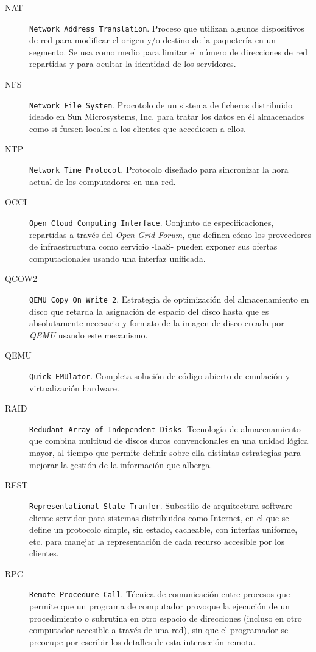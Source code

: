 \begin{description}
\item[NAT] \texttt{Network Address Translation}. Proceso que utilizan algunos dis\-po\-si\-ti\-vos de red para modificar el origen y/o destino de la paqueter\'ia en un segmento. Se usa como medio para limitar el n\'umero de direcciones de red repartidas y para ocultar la identidad de los servidores.
\item[NFS] \texttt{Network File System}. Procotolo de un sistema de ficheros distribuido ideado en Sun Microsystems, Inc. para tratar los datos en \'el almacenados como si fuesen locales a los clientes que accediesen a ellos.
\item[NTP] \texttt{Network Time Protocol}. Protocolo dise\~nado para sincronizar la hora actual de los computadores en una red.
\item[OCCI] \texttt{Open Cloud Computing Interface}. Conjunto de especificaciones, re\-par\-ti\-das a trav\'es del \emph{Open Grid Forum}, que definen c\'omo los proveedores de infraestructura como servicio -IaaS- pueden exponer sus ofertas computacionales usando una interfaz unificada.
\item[QCOW2] \texttt{QEMU Copy On Write 2}. Estrategia de optimizaci\'on del almacenamiento en disco que retarda la asignaci\'on de espacio del disco hasta que es absolutamente necesario y formato de la imagen de disco creada por \emph{QEMU} usando este mecanismo.
\item[QEMU] \texttt{Quick EMUlator}. Completa soluci\'on de c\'odigo abierto de emulaci\'on y virtualizaci\'on hardware.
\item[RAID] \texttt{Redudant Array of Independent Disks}. Tecnolog\'ia de al\-ma\-ce\-na\-mien\-to que combina multitud de discos duros convencionales en una unidad l\'ogica mayor, al tiempo que permite definir sobre ella distintas estrategias para mejorar la gesti\'on de la informaci\'on que alberga.
\item[REST] \texttt{Representational State Tranfer}. Subestilo de arquitectura software cliente-servidor para sistemas distribuidos como Internet, en el que se define un protocolo simple, sin estado, cacheable, con interfaz uniforme, etc. para manejar la representaci\'on de cada recurso accesible por los clientes.
\item[RPC] \texttt{Remote Procedure Call}. T\'ecnica de comunicaci\'on entre procesos que permite que un programa de computador provoque la ejecuci\'on de un procedimiento o subrutina en otro espacio de direcciones (incluso en otro computador accesible a trav\'es de una red), sin que el programador se preocupe por escribir los detalles de esta interacci\'on remota.

\end{description}
